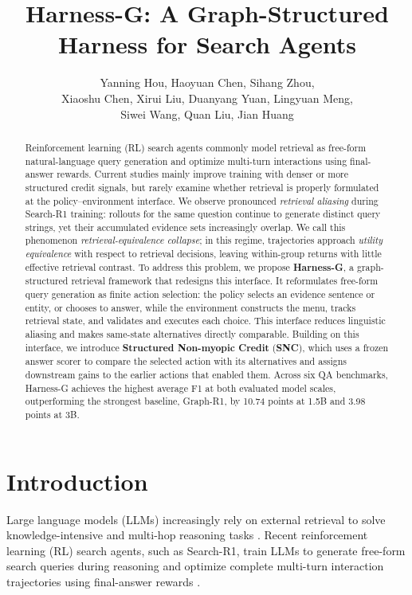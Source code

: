 \documentclass[letterpaper]{article} %
\title{Harness-G: A Graph-Structured Harness for Search Agents}
\author{
Yanning Hou\equalcontrib,
Haoyuan Chen\equalcontrib,
Sihang Zhou\corresponding,\\
Xiaoshu Chen,
Xirui Liu,
Duanyang Yuan,
Lingyuan Meng,\\
Siwei Wang,
Quan Liu,
Jian Huang
}
\begin{document}
\maketitle

\begin{abstract}
Reinforcement learning (RL) search agents commonly model retrieval as
free-form natural-language query generation and optimize multi-turn
interactions using final-answer rewards.
Current studies mainly improve training with denser or more structured
credit signals, but rarely examine whether retrieval is properly
formulated at the policy--environment interface.
We observe pronounced \emph{retrieval aliasing} during Search-R1
training: rollouts for the same question continue to generate distinct
query strings, yet their accumulated evidence sets increasingly
overlap.
We call this phenomenon \emph{retrieval-equivalence collapse}; in this
regime, trajectories approach \emph{utility equivalence} with respect
to retrieval decisions, leaving within-group returns with little
effective retrieval contrast.
To address this problem, we propose \textbf{Harness-G}, a
graph-structured retrieval framework that redesigns this interface.
It reformulates free-form query generation as finite action selection:
the policy selects an evidence sentence or entity, or chooses to answer,
while the environment constructs the menu, tracks retrieval state, and
validates and executes each choice.
This interface reduces linguistic aliasing and makes same-state
alternatives directly comparable.
Building on this interface, we introduce \textbf{Structured Non-myopic
Credit} (\textbf{SNC}), which uses a frozen answer scorer to compare the
selected action with its alternatives and assigns downstream gains to
the earlier actions that enabled them.
Across six QA benchmarks, Harness-G achieves the highest average F1 at
both evaluated model scales, outperforming the strongest baseline,
Graph-R1, by 10.74 points at 1.5B and 3.98 points at 3B.
\end{abstract}

\begin{links}
\end{links}

\section{Introduction}

Large language models (LLMs) increasingly rely on external retrieval to
solve knowledge-intensive and multi-hop reasoning tasks
\citep{lewis2020rag,trivedi2023ircot,jiang2023flare}.
Recent reinforcement learning (RL) search agents, such as Search-R1,
train LLMs to generate free-form search queries during reasoning and
optimize complete multi-turn interaction trajectories using final-answer
rewards
\citep{jin2025searchr1,song2025r1searcher,zheng2025deepresearcher}.
\end{document}
